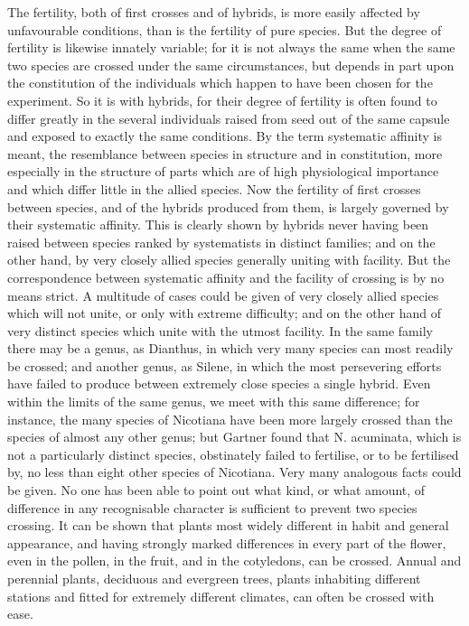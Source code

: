The fertility, both of first crosses and of hybrids, is more easily affected by unfavourable conditions, than is the fertility of pure species. But the degree of fertility is likewise innately variable; for it is not always the same when the same two species are crossed under the same circumstances, but depends in part upon the constitution of the individuals which happen to have been chosen for the experiment. So it is with hybrids, for their degree of fertility is often found to differ greatly in the several individuals raised from seed out of the same capsule and exposed to exactly the same conditions.
By the term systematic affinity is meant, the resemblance between species in structure and in constitution, more especially in the structure of parts which are of high physiological importance and which differ little in the allied species. Now the fertility of first crosses between species, and of the hybrids produced from them, is largely governed by their systematic affinity. This is clearly shown by hybrids never having been raised between species ranked by systematists in distinct families; and on the other hand, by very closely allied species generally uniting with facility. But the correspondence between systematic affinity and the facility of crossing is by no means strict. A multitude of cases could be given of very closely allied species which will not unite, or only with extreme difficulty; and on the other hand of very distinct species which unite with the utmost facility. In the same family there may be a genus, as Dianthus, in which very many species can most readily be crossed; and another genus, as Silene, in which the most persevering efforts have failed to produce between extremely close species a single hybrid. Even within the limits of the same genus, we meet with this same difference; for instance, the many species of Nicotiana have been more largely crossed than the species of almost any other genus; but Gartner found that N. acuminata, which is not a particularly distinct species, obstinately failed to fertilise, or to be fertilised by, no less than eight other species of Nicotiana. Very many analogous facts could be given.
No one has been able to point out what kind, or what amount, of difference in any recognisable character is sufficient to prevent two species crossing. It can be shown that plants most widely different in habit and general appearance, and having strongly marked differences in every part of the flower, even in the pollen, in the fruit, and in the cotyledons, can be crossed. Annual and perennial plants, deciduous and evergreen trees, plants inhabiting different stations and fitted for extremely different climates, can often be crossed with ease.
